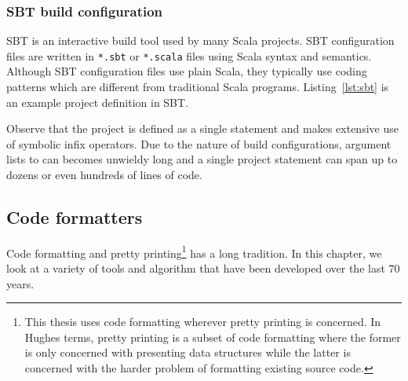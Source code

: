 \subsubsection{SBT build configuration}
SBT\autocite{_sbt_????} is an interactive build tool used by many Scala projects.
SBT configuration files are written in \texttt{*.sbt} or \texttt{*.scala} files using Scala syntax and semantics.
Although SBT configuration files use plain Scala, they typically use coding patterns which are different from traditional Scala programs.
Listing~\ref{lst:sbt} is an example project definition in SBT.

Observe that the project is defined as a single statement and makes extensive use of symbolic infix operators.
Due to the nature of build configurations, argument lists to can becomes unwieldy long and a single project statement can span up to dozens or even hundreds of lines of code.


\subsection{Code formatters}
%

Code formatting and pretty printing\footnote{
  This thesis uses code formatting wherever pretty printing is concerned.
  In Hughes\autocite{hughes_design_1995} terms, pretty printing is a subset of code formatting where
  the former is only concerned with presenting data structures while the latter is
  concerned with the harder problem of formatting existing source code.} has a long tradition.
In this chapter, we look at a variety of tools and algorithm that have been developed over the last 70 years.

